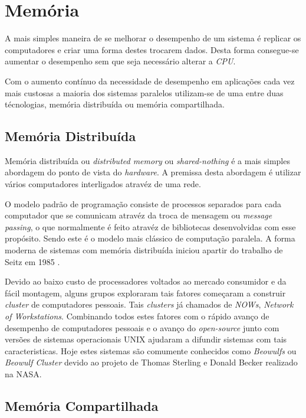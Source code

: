 \chapter{Memória}

A mais simples maneira de se melhorar o desempenho de um sistema é
replicar os computadores e criar uma forma destes trocarem dados.
Desta forma consegue-se aumentar o desempenho sem que seja necessário alterar a
\textit{CPU}.

Com o aumento contínuo da necessidade de desempenho em aplicações cada vez mais
custosas a maioria dos sistemas paralelos utilizam-se de uma entre duas
técnologias, memória distribuída ou memória compartilhada.


\section{Memória Distribuída}

Memória distribuída ou \textit{distributed memory} ou \textit{shared-nothing} é
a mais simples abordagem do ponto de vista do \textit{hardware}. A premissa
desta abordagem é utilizar vários computadores interligados atravéz de uma rede.

O modelo padrão de programação consiste de processos separados para cada
computador que se comunicam atravéz da troca de mensagem ou 
\textit{message passing}, o que normalmente é feito atravéz de bibliotecas
desenvolvidas com esse propósito. Sendo este é o modelo mais clássico de 
computação paralela. A forma moderna de sistemas com memória distribuída iniciou
apartir do trabalho de Seitz em 1985 \cite{Seitz:1985}.

Devido ao baixo custo de processadores voltados ao mercado consumidor e da fácil
montagem, alguns grupos exploraram tais fatores começaram a construir
\textit{cluster} de computadores pessoais. Tais \textit{clusters} já chamados de
\textit{NOWs}, \textit{Network of Workstations}.
Combinando todos estes fatores com o rápido avanço de desempenho de computadores
pessoais e o avanço do \textit{open-source} junto com  versões de sistemas 
operacionais UNIX ajudaram a difundir sistemas com tais caracteristicas. Hoje
estes sistemas são comumente conhecidos como \textit{Beowulfs} ou
\textit{Beowulf Cluster} devido ao projeto de Thomas Sterling e Donald Becker
realizado na NASA.

\section{Memória Compartilhada}
